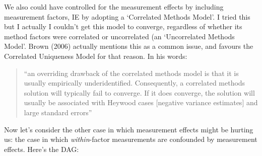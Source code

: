 \documentclass[
  letterpaper,
  DIV=11,
  numbers=noendperiod]{scrreprt}
\begin{document}
We also could have controlled for the measurement effects by including
measurement factors, IE by adopting a `Correlated Methods Model'. I
tried this but I actually I couldn't get this model to converge,
regardless of whether its method factors were correlated or uncorrelated
(an `Uncorrelated Methods Model'. Brown (2006) actually mentions this as
a common issue, and favours the Correlated Uniqueness Model for that
reason. In his words:

\begin{quote}
``an overriding drawback of the correlated methods model is that it is
usually empirically underidentified. Consequently, a correlated methods
solution will typically fail to converge. If it does converge, the
solution will usually be associated with Heywood cases {[}negative
variance estimates{]} and large standard errors''
\end{quote}

Now let's consider the other case in which measurement effects might be
hurting us: the case in which \emph{within}-factor measurements are
confounded by measurement effects. Here's the DAG:
\end{document}
